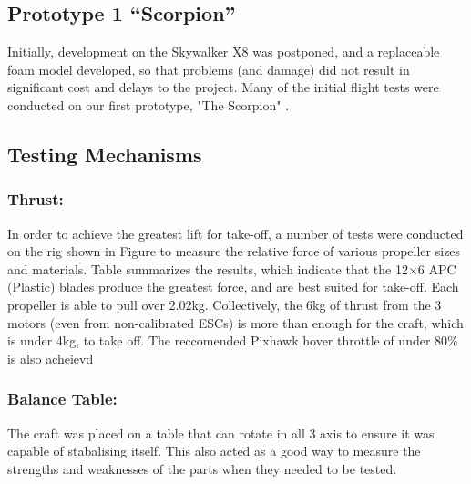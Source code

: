 
\subsection{Prototype 1 ``Scorpion''}
Initially, development on the Skywalker X8 was postponed, and a replaceable foam model developed, so that problems (and damage) did not result in significant cost and delays to the project. Many of the initial flight tests were conducted on our first prototype, "The Scorpion" .

\subsection{Testing Mechanisms}
\subsubsection*{Thrust:} In order to achieve the greatest lift for take-off, a number of tests were conducted on the rig shown in Figure to measure the relative force of various propeller sizes and materials. Table  summarizes the results, which indicate that the 12$\times$6 APC (Plastic) blades produce the greatest force, and are best suited for take-off. Each propeller is able to pull over 2.02kg. Collectively, the 6kg of thrust from the 3 motors (even from non-calibrated ESCs) is more than enough for the craft, which is under 4kg, to take off. The reccomended Pixhawk hover throttle of under 80\% is also acheievd  

\subsubsection*{Balance Table:} The craft was placed on a table that can rotate in all 3 axis to ensure it was capable of stabalising itself. This also acted as a good way to measure the strengths and weaknesses of the parts when they needed to be tested. 

